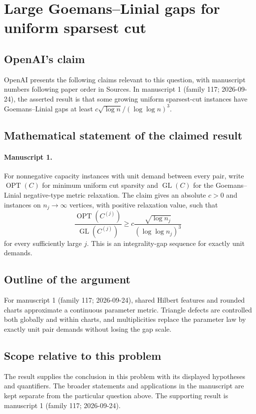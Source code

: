 \documentclass[11pt]{article}
\begin{document}
\section*{Large Goemans–Linial gaps for uniform sparsest cut}

\subsection{OpenAI's claim}
OpenAI presents the following claims relevant to this question, with manuscript numbers following paper order in Sources. In manuscript 1 (family 117; 2026-09-24), the asserted result is that some growing uniform sparsest-cut instances have Goemans--Linial gaps at least $c\sqrt{\log n}/(\log\log n)^3$.

\subsection{Mathematical statement of the claimed result}
\paragraph{Manuscript 1.}
For nonnegative capacity instances with unit demand between every pair, write $\operatorname{OPT}(C)$ for minimum uniform cut sparsity and $\operatorname{GL}(C)$ for the Goemans--Linial negative-type metric relaxation. The claim gives an absolute $c>0$ and instances on $n_j\to\infty$ vertices, with positive relaxation value, such that
\[
 \frac{\operatorname{OPT}(C^{(j)})}{\operatorname{GL}(C^{(j)})}
 \ge c\frac{\sqrt{\log n_j}}{(\log\log n_j)^3}
\]
for every sufficiently large $j$. This is an integrality-gap sequence for exactly unit demands.

\subsection{Outline of the argument}
For manuscript 1 (family 117; 2026-09-24), shared Hilbert features and rounded charts approximate a continuous parameter metric. Triangle defects are controlled both globally and within charts, and multiplicities replace the parameter law by exactly unit pair demands without losing the gap scale.

\subsection{Scope relative to this problem}
The result supplies the conclusion in this problem with its displayed hypotheses and quantifiers. The broader statements and applications in the manuscript are kept separate from the particular question above. The supporting result is manuscript 1 (family 117; 2026-09-24).
\end{document}
